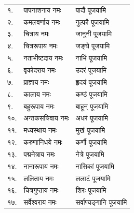 \begin{longtable}{ll@{— }l}
१.& पापनाशनाय नमः & पादौ पूजयामि\\
२.& कमलवर्णाय नमः & गुल्फौ पूजयामि\\
३.& चित्राय नमः & जानुनी पूजयामि\\
४.& चित्ररूपाय नमः & जङ्घे पूजयामि\\
५.& नताभीष्टदाय नमः & नाभिं पूजयामि\\
६.& वृकोदराय नमः & उदरं पूजयामि\\
७.& प्राज्ञाय नमः & हृदयं पूजयामि\\
८.& कालाय नमः & कण्ठं पूजयामि\\
९.& बहुरूपाय नमः & बाहून् पूजयामि\\
१०.& अन्तकसचिवाय नमः & अधरं पूजयामि\\
११.& मध्यस्थाय नमः & मुखं पूजयामि\\
१२.& करुणानिधये नमः & कर्णौ पूजयामि\\
१३.& पद्मनेत्राय नमः & नेत्रे पूजयामि\\
१४.& नानारूपाय नमः & नासिकां पूजयामि\\
१५.& ललिताय नमः & ललाटं पूजयामि\\
१६.& चित्रगुप्ताय नमः & शिरः पूजयामि\\
१७.& सर्वेश्वराय नमः & सर्वाण्यङ्गानि पूजयामि\\
\end{longtable}

